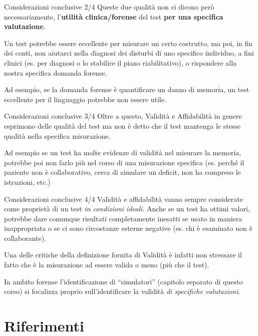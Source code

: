 \documentclass[
  ignorenonframetext,
  aspectratio=169,
]{beamer}
\begin{document}
\begin{frame}{Considerazioni conclusive 2/4}
\label{considerazioni-conclusive-24}
Queste due qualità non ci dicono però necessariamente, l'\textbf{utilità
clinica/forense} del test \textbf{per una specifica valutazione}.

Un test potrebbe essere eccellente per misurare un certo costrutto, ma
poi, in fin dei conti, non aiutarci nella diagnosi dei disturbi di uno
specifico individuo, a fini clinici (es. per diagnosi o lo stabilire il
piano riabilitativo), o rispondere alla nostra specifica domanda
forense.

Ad esempio, se la domanda forense è quantificare un danno di memoria, un
test eccellente per il linguaggio potrebbe non essere utile.
\end{frame}

\begin{frame}{Considerazioni conclusive 3/4}
\label{considerazioni-conclusive-34}
Oltre a questo, Validità e Affidabilità in genere esprimono delle
qualità del test ma non è detto che il test mantenga le stesse qualità
nella specifica misurazione.

Ad esempio se un test ha molte evidenze di validità nel misurare la
memoria, potrebbe poi non farlo più nel corso di una misurazione
specifica (es. perché il paziente non è collaborativo, cerca di simulare
un deficit, non ha compreso le istruzioni, etc.)
\end{frame}

\begin{frame}{Considerazioni conclusive 4/4}
\label{considerazioni-conclusive-44}
Validità e affidabilità vanno sempre considerate come proprietà di un
test \emph{in condizioni ideali}. Anche se un test ha ottimi valori,
potrebbe dare comunque risultati completamente inesatti se usato in
maniera inappropriata o se ci sono circostanze esterne negative (es. chi
è esaminato non è collaborante).

Una delle critiche della definizione fornita di Validità è infatti non
stressare il fatto che è la misurazione ad essere valida o meno (più che
il test).

In ambito forense l'identificazione di ``simulatori'' (capitolo separato
di questo corso) si focalizza proprio sull'identificare la validità
\emph{di specifiche valutazioni}.
\end{frame}

\section{Riferimenti}\label{riferimenti}
\end{document}
